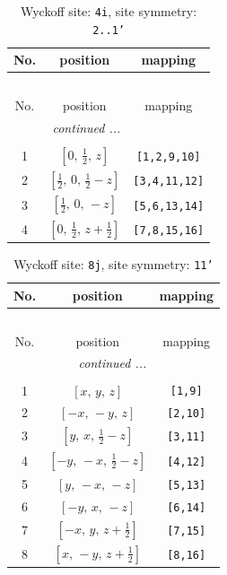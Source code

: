\documentclass[fleqn,8pt]{jsarticle}
\begin{document}
\renewcommand{\arraystretch}{1.2}
\begin{longtable}{ccc}
\caption{Wyckoff site: {\tt 4i}, site symmetry: {\tt 2..1'}}
 \\
 \hline \hline
No. & position & mapping \\ \hline \endfirsthead

\multicolumn{2}{l}{\tablename\ \thetable{}} \\
 \hline \hline
No. & position & mapping \\ \hline \endhead

 \hline \hline
\multicolumn{2}{r}{\footnotesize\it continued ...} \\ \endfoot

 \hline \hline
\multicolumn{2}{r}{} \\ \endlastfoot

1 & $\left[ 0,\, \frac{1}{2},\, z \right]$ & {\tt [1,2,9,10]} \\ \hline
2 & $\left[ \frac{1}{2},\, 0,\, \frac{1}{2} - z \right]$ & {\tt [3,4,11,12]} \\ \hline
3 & $\left[ \frac{1}{2},\, 0,\, - z \right]$ & {\tt [5,6,13,14]} \\ \hline
4 & $\left[ 0,\, \frac{1}{2},\, z + \frac{1}{2} \right]$ & {\tt [7,8,15,16]} \\
\end{longtable}
\renewcommand{\arraystretch}{1.2}
\begin{longtable}{ccc}
\caption{Wyckoff site: {\tt 8j}, site symmetry: {\tt 11'}}
 \\
 \hline \hline
No. & position & mapping \\ \hline \endfirsthead

\multicolumn{2}{l}{\tablename\ \thetable{}} \\
 \hline \hline
No. & position & mapping \\ \hline \endhead

 \hline \hline
\multicolumn{2}{r}{\footnotesize\it continued ...} \\ \endfoot

 \hline \hline
\multicolumn{2}{r}{} \\ \endlastfoot

1 & $\left[ x,\, y,\, z \right]$ & {\tt [1,9]} \\ \hline
2 & $\left[ - x,\, - y,\, z \right]$ & {\tt [2,10]} \\ \hline
3 & $\left[ y,\, x,\, \frac{1}{2} - z \right]$ & {\tt [3,11]} \\ \hline
4 & $\left[ - y,\, - x,\, \frac{1}{2} - z \right]$ & {\tt [4,12]} \\ \hline
5 & $\left[ y,\, - x,\, - z \right]$ & {\tt [5,13]} \\ \hline
6 & $\left[ - y,\, x,\, - z \right]$ & {\tt [6,14]} \\ \hline
7 & $\left[ - x,\, y,\, z + \frac{1}{2} \right]$ & {\tt [7,15]} \\ \hline
8 & $\left[ x,\, - y,\, z + \frac{1}{2} \right]$ & {\tt [8,16]} \\
\end{longtable}
\end{document}
